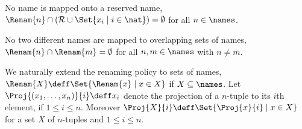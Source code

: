 \documentclass[copyright,creativecommons]{eptcs}
\begin{document}
\begin{compactenum}
	\item No name is mapped onto a reserved name, \ie $ \Renam{n} \cap \left( \mathcal{R} \cup \Set{ x_i \mid i \in \nat } \right) = \emptyset $ for all $ n \in \names $.
	\item No two different names are mapped to overlapping sets of names, \ie $ \Renam{n} \cap \Renam{m} = \emptyset $ for all $ n, m \in \names $ with $ n \neq m $.
\end{compactenum}
We naturally extend the renaming policy to sets of names, \ie $ \Renam{X} \deff \Set{ \Renam{x} \mid x \in X } $ if $ X \subseteq \names $.
Let $ \Proj{\left( x_1, \ldots, x_n \right)}{i} \deff x_i $ denote the projection of a $ n $-tuple to its $ i $th element, if $ 1 \leq i \leq n $. Moreover $ \Proj{X}{i} \deff \Set{ \Proj{x}{i} \mid x \in X } $ for a set $ X $ of $ n $-tuples and $ 1 \leq i \leq n $.
\end{document}
